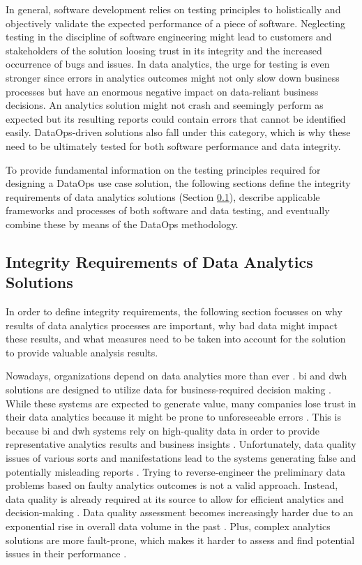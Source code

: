 In general, software development relies on testing principles to holistically and objectively validate the expected performance of a piece of software. Neglecting testing in the discipline of software engineering might lead to customers and stakeholders of the solution loosing trust in its integrity and the increased occurrence of bugs and issues. In data analytics, the urge for testing is even stronger since errors in analytics outcomes might not only slow down business processes but have an enormous negative impact on data-reliant business decisions. An analytics solution might not crash and seemingly perform as expected but its resulting reports could contain errors that cannot be identified easily. DataOps-driven solutions also fall under this category, which is why these need to be ultimately tested for both software performance and data integrity.

To provide fundamental information on the testing principles required for designing a DataOps use case solution, the following sections define the integrity requirements of data analytics solutions (Section \ref{sec:2-1-requirements}), describe applicable frameworks and processes of both software and data testing, and eventually combine these by means of the DataOps methodology.



\subsection{Integrity Requirements of Data Analytics Solutions} \label{sec:2-1-requirements}
In order to define integrity requirements, the following section focusses on why results of data analytics processes are important, why bad data might impact these results, and what measures need to be taken into account for the solution to provide valuable analysis results.

Nowadays, organizations depend on data analytics more than ever \cite{Munawar2011}. \ac{bi} and \ac{dwh} solutions are designed to utilize data for business-required decision making \cite{Souibgui2019}. While these systems are expected to generate value, many companies lose trust in their data analytics because it might be prone to unforeseeable errors \cite{BISurvey.com}. This is because \ac{bi} and \ac{dwh} systems rely on high-quality data in order to provide representative analytics results and business insights \cite{Munawar2011}. Unfortunately, data quality issues of various sorts and manifestations lead to the systems generating false and potentially misleading reports \cite{Freudiger2014}\cite{Munawar2011}\cite{Redman2016}. Trying to reverse-engineer the preliminary data problems based on faulty analytics outcomes is not a valid approach. Instead, data quality is already required at its source to allow for efficient analytics and decision-making \cite{Redman2020}\cite{Tricentis}. Data quality assessment becomes increasingly harder due to an exponential rise in overall data volume in the past \cite{Freudiger2014}. Plus, complex analytics solutions are more fault-prone, which makes it harder to assess and find potential issues in their performance \cite{Homayouni2018}.


